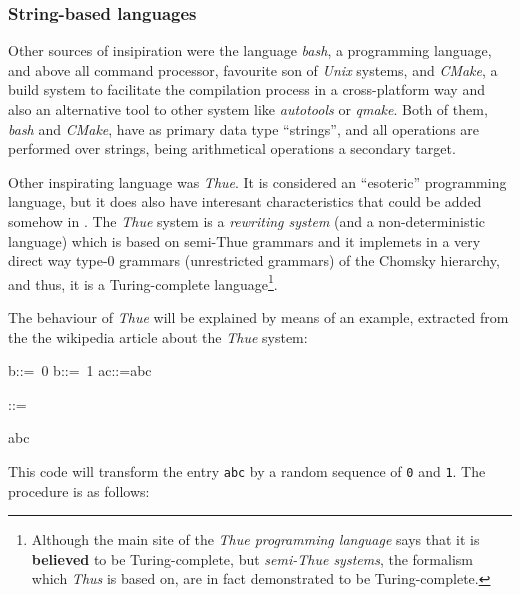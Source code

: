 \documentclass{article}
\begin{document}
\subsubsection{String-based languages}
Other sources of insipiration were the language \textit{bash}, a programming
language, and above all command processor, favourite son of \textit{Unix}
systems, and \textit{CMake}, a build system to facilitate the compilation
process in a cross-platform way and also an alternative tool to other system
like \textit{autotools} or \textit{qmake}. Both of them, \textit{bash} and
\textit{CMake}, have as primary data type ``strings'', and all operations are
performed over strings, being arithmetical operations a secondary target.

Other inspirating language was \textit{Thue}. It is considered an ``esoteric''
programming language, but it does also have interesant characteristics that
could be added somehow in \faupp. The \textit{Thue} system is a
\textit{rewriting system} (and a non-deterministic language) which is based on
semi-Thue grammars and it implemets in a very direct way type-0 grammars
(unrestricted grammars) of the Chomsky hierarchy, and thus, it is a
Turing-complete language\footnote{Although the main site of the \textit{Thue
    programming language} says that it is \textbf{believed} to be
  Turing-complete, but \textit{semi-Thue systems}, the formalism which
  \textit{Thus} is based on, are in fact demonstrated to be Turing-complete.}.

The behaviour of \textit{Thue} will be explained by means of an example, extracted
from the the wikipedia article about the \textit{Thue} system:

\begin{Thue}
  b::=~0
  b::=~1
  ac::=abc

  ::=

  abc
\end{Thue}

This code will transform the entry \texttt{abc} by a random sequence of
\texttt{0} and \texttt{1}. The procedure is as follows:

\newcommand{\mathred}[1]{\textcolor{red}{#1}}
\end{document}
